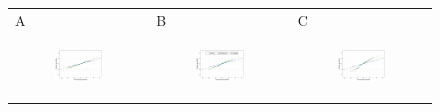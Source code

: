 \documentclass[11pt]{article}
\begin{document}
\begin{figure}[ht]
	\begin{tabular}{lll}
	A&B&C\\
	\begin{subfigure}[t]{0.3\linewidth}
		\centering
		\includegraphics[width=1\linewidth]{figs/figure-5a.pdf} 
	\end{subfigure}&
	\begin{subfigure}[t]{0.3\linewidth}
		\centering
		\includegraphics[width=1\linewidth]{figs/figure-5b.pdf}
	\end{subfigure}&
	\begin{subfigure}[t]{0.3\linewidth}
		\centering
		\includegraphics[width=1\linewidth]{figs/figure-5c.pdf}

\end{subfigure}
\end{tabular}
\end{figure}
\end{document}
